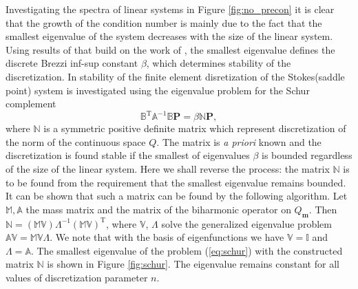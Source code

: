 \documentclass{marine_2015}
\newcommand{\Amat}{\ensuremath{\mathbb{A}}}
\newcommand{\Bmat}{\ensuremath{\mathbb{B}}}
\newcommand{\Pvec}{\ensuremath{\mathbf{P}}}
\newcommand{\Qh}{\ensuremath{Q_{\mathbf{m}}}}
\begin{document}
Investigating the spectra of linear systems in Figure \ref{fig:no_precon} it is
clear that the growth of the condition number is mainly due to the fact that the
smallest eigenvalue of the system decreases with the size of the linear system.
Using results of \cite{marie} that build on the work of \cite{malkus}, the
smallest eigenvalue defines the discrete Brezzi inf-sup constant $\beta$, which
determines stability of the discretization. In \cite{marie} stability of the
finite element disretization of the Stokes(saddle point) system is investigated using
the eigenvalue problem for the Schur complement
\begin{equation}
  \label{eq:schur}
  \Bmat^{\text{T}}\Amat^{-1}\Bmat\Pvec = \beta\mathbb{N}\Pvec,
\end{equation}
where $\mathbb{N}$ is a symmetric positive definite matrix which
represent discretization of the norm of the continuous space $Q$. The matrix is
\textit{a priori} known and the discretization is found stable if the smallest 
of eigenvalues $\beta$ is bounded regardless of the size of the linear system. Here
we shall reverse the process: the matrix $\mathbb{N}$ is to be found from the
requirement that the smallest eigenvalue remains bounded. It can be shown that
such a matrix can be found by the following algorithm. Let $\mathbb{M},
\mathbb{A}$ the mass matrix and the matrix of the biharmonic operator on $\Qh$.
Then
$\mathbb{N}=\left(\mathbb{M}\mathbb{V}\right){\Lambda}^{-1}\left(\mathbb{M}\mathbb{V}\right)^{\text{T}}$,
where $\mathbb{V}$, $\Lambda$  solve the generalized eigenvalue problem
$\mathbb{A}\mathbb{V}=\mathbb{M}\mathbb{V}\Lambda$. We note that with the basis
of eigenfunctions we have $\mathbb{V}=\mathbb{I}$ and $\Lambda=\mathbb{A}$. The
smallest eigenvalue of the problem (\ref{eq:schur}) with the constructed matrix
$\mathbb{N}$ is shown in Figure \ref{fig:schur}. The eigenvalue remains constant
for all values of discretization parameter $n$.
 
\end{document}

